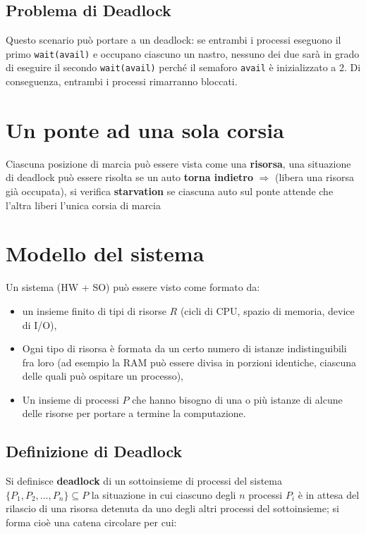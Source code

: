 \subsection{Problema di Deadlock}
Questo scenario può portare a un deadlock: se entrambi i processi eseguono il primo \texttt{wait(avail)} e occupano ciascuno un nastro, nessuno dei due sarà in grado di eseguire il secondo \texttt{wait(avail)} perché il semaforo \texttt{avail} è inizializzato a 2. Di conseguenza, entrambi i processi rimarranno bloccati.

\section{Un ponte ad una sola corsia}
Ciascuna posizione di marcia può essere vista come una \textbf{risorsa}, una situazione di deadlock può essere risolta se un auto \textbf{torna indietro} $\Longrightarrow$ (libera una risorsa già occupata), si verifica \textbf{starvation} se ciascuna auto sul ponte attende che l'altra liberi l'unica corsia di marcia

\section{Modello del sistema}
Un sistema (HW + SO) può essere visto come formato da:
\begin{itemize}
    \item un insieme finito di tipi di risorse $R$ (cicli di CPU, spazio di memoria, device di I/O),
    \item Ogni tipo di risorsa è formata da un certo numero di istanze indistinguibili fra loro (ad esempio la RAM può essere divisa in porzioni identiche, ciascuna delle quali può ospitare un processo),
    \item Un insieme di processi $P$ che hanno bisogno di una o più istanze di alcune delle risorse per portare a termine la computazione.
\end{itemize}

\subsection*{Definizione di Deadlock}

Si definisce \textbf{deadlock} di un sottoinsieme di processi del sistema $\{P_1, P_2, \dots, P_n\} \subseteq P$ la situazione in cui ciascuno degli $n$ processi $P_i$ è in attesa del rilascio di una risorsa detenuta da uno degli altri processi del sottoinsieme; si forma cioè una catena circolare per cui:

